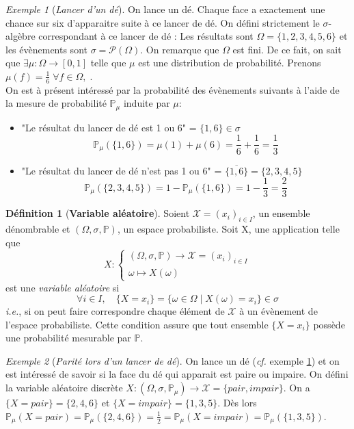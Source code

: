 \documentclass[12pt,a4paper]{report}
\theoremstyle{definition}%
\newtheorem{definition}{Définition}[chapter]
\theoremstyle{remark}
\newtheorem{example}{Exemple}[chapter]
\newcommand{\ie}{\textit{i.e.}, }
\newcommand{\cf}{\textit{cf.} }
\newcommand{\pr}{\mathbb{P}}
\let\labelitemi\labelitemii
\begin{document}
\begin{example}[\textit{Lancer d'un dé}]\label{die}
	On lance un dé. Chaque face a exactement une chance sur six d'apparaitre suite à ce lancer de dé. On défini strictement le $\sigma$-algèbre correspondant à ce lancer de dé : 
	Les résultats sont $\Omega = \{1, 2, 3, 4, 5, 6\}$ et les évènements sont $\sigma = \mathcal{P}(\Omega)$.
	On remarque que $\Omega$ est fini.
	De ce fait, on sait que $\exists \mu: \Omega \rightarrow [0,1]$ telle que $\mu$ est une distribution de probabilité. Prenons $\mu(f) = \frac{1}{6} \; \forall f \in \Omega, \; $.\\
	On est à présent intéressé par la probabilité des évènements suivants à l'aide de la mesure de probabilité $\pr_{\mu}$ induite par $\mu$:
	\begin{itemize}
		\renewcommand{\labelitemi}{\tiny$\bullet$}
		\item "Le résultat du lancer de dé est 1 ou 6" = $\{1, 6\} \in \sigma$
		\[\pr_{\mu}(\{1,6\}) = \mu(1) + \mu(6) = \frac{1}{6} + \frac{1}{6} = \frac{1}{3}\]
		\item "Le résultat du lancer de dé n'est pas 1 ou 6" = $\overline{\{1, 6\}} = \{2, 3, 4, 5\}$
		\[\pr_{\mu}(\{2, 3, 4, 5\}) = 1 - \pr_{\mu}(\{1, 6\}) = 1 - \frac{1}{3} = \frac{2}{3}\]
	\end{itemize}
\end{example}

\begin{definition}[\textbf{Variable aléatoire}]
	Soient $\mathcal X = (x_i)_{i \in I}$, un ensemble dénombrable et $(\Omega, \sigma, \pr)$, un espace probabiliste. Soit X, une application telle que
	\[X :
	\begin{cases}
	(\Omega, \sigma, \pr) \rightarrow \mathcal{X} = (x_i)_{i \in I} \\
	\omega \mapsto X(\omega)
	\end{cases}
	\]
	est une \textit{variable aléatoire} si 
	\[\forall i \in I, \quad \{X = x_i\} = \{\omega \in \Omega \; | \; X(\omega) = x_i \} \in \sigma\]
	\ie si on peut faire correspondre chaque élément de $\mathcal{X}$  à un évènement de l'espace probabiliste. Cette condition assure que tout ensemble $\{X = x_i\}$ possède une probabilité mesurable par $\pr$.~\cite{Course2}
\end{definition}

\begin{example}[\textit{Parité lors d'un lancer de dé}]
	On lance un dé (\cf exemple \ref{die}) et on est intéressé de savoir si la face du dé qui apparait est paire ou impaire. On défini la variable aléatoire discrète $X:(\Omega, \sigma, \pr_{\mu}) \rightarrow \mathcal{X} = \{pair, impair\}$. On a $\{X = pair\} = \{2, 4, 6\}$ et $\{X = impair\} = \{1, 3, 5\}$. Dès lors $\pr_{\mu}(X = pair) = \pr_{\mu}(\{2, 4, 6\}) =\frac{1}{2} = \pr_{\mu}(X = impair) = \pr_{\mu}(\{1, 3, 5\})$.
\end{example}
\end{document}
